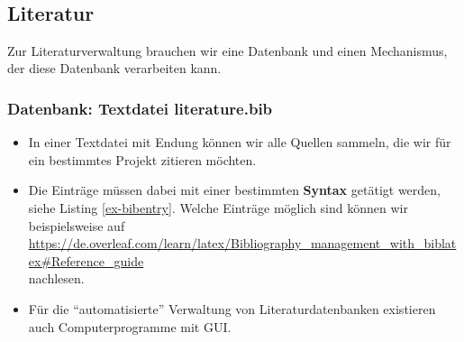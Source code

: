 ~\\


\subsection{Literatur}
Zur Literaturverwaltung brauchen wir eine Datenbank und einen Mechanismus, der diese Datenbank verarbeiten kann.
\subsubsection{Datenbank: Textdatei literature.bib}
\begin{itemize}
	\item In einer Textdatei mit Endung  können wir alle Quellen sammeln, die wir für ein bestimmtes Projekt zitieren möchten.
 \item Die Einträge müssen dabei mit einer bestimmten \textbf{Syntax} getätigt werden, siehe Listing \ref{ex-bibentry}. Welche Einträge möglich sind können wir beispielsweise auf\\ \url{https://de.overleaf.com/learn/latex/Bibliography_management_with_biblatex#Reference_guide}\\ nachlesen.
 \item Für die ``automatisierte'' Verwaltung von Literaturdatenbanken existieren auch Computerprogramme mit GUI.
\end{itemize}



